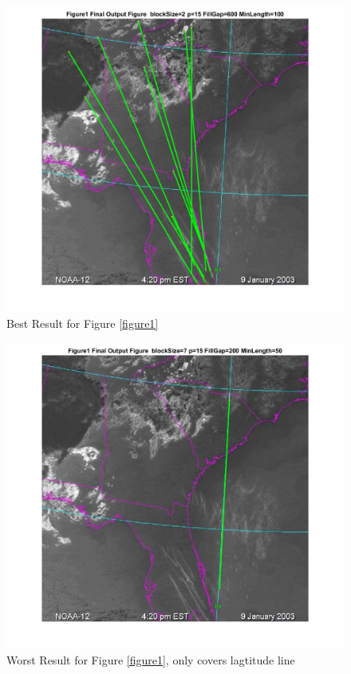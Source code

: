 \begin{figure}[hbtp]
	\centering
	\includegraphics[width=6in]{pic/Figure1_best.jpg}
	\caption{Best Result for Figure \ref{figure1}}
	\label{Figure1_best}
\end{figure}


\begin{figure}[hbtp]
	\centering
	\includegraphics[width=6in]{pic/Figure1_worst.jpg}
	\caption{Worst Result for Figure \ref{figure1}, only covers lagtitude line}
	\label{Figure1_worst}
\end{figure}


